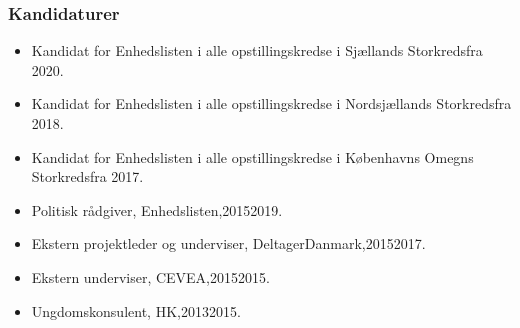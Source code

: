 \documentclass[11pt, a4paper]{awesome-cv}
\begin{document}
\begin{cvletter}
\subsubsection*{Kandidaturer}
\begin{itemize}
\item Kandidat for Enhedslisten i alle opstillingskredse i Sjællands Storkredsfra 2020.
\item Kandidat for Enhedslisten i alle opstillingskredse i Nordsjællands Storkredsfra 2018.
\item Kandidat for Enhedslisten i alle opstillingskredse i Københavns Omegns Storkredsfra 2017.
\end{itemize}
\begin{itemize}
\item Politisk rådgiver, Enhedslisten,20152019.
\item Ekstern projektleder og underviser, DeltagerDanmark,20152017.
\item Ekstern underviser, CEVEA,20152015.
\item Ungdomskonsulent, HK,20132015.
\end{itemize}
\end{cvletter}
\end{document}
